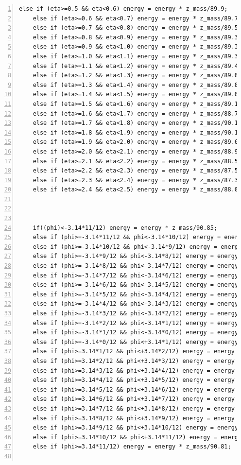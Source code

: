 \documentclass[11pt,a4paper,notitlepage]{scrartcl}
\begin{document}
\begin{lstlisting}[numbers=left, breaklines=true]
	else if (eta>=0.5 && eta<0.6) energy = energy * z_mass/89.9;
	else if (eta>=0.6 && eta<0.7) energy = energy * z_mass/89.72;
	else if (eta>=0.7 && eta<0.8) energy = energy * z_mass/89.59;
	else if (eta>=0.8 && eta<0.9) energy = energy * z_mass/89.33;
	else if (eta>=0.9 && eta<1.0) energy = energy * z_mass/89.39;
	else if (eta>=1.0 && eta<1.1) energy = energy * z_mass/89.30;
	else if (eta>=1.1 && eta<1.2) energy = energy * z_mass/89.49;
	else if (eta>=1.2 && eta<1.3) energy = energy * z_mass/89.04;
	else if (eta>=1.3 && eta<1.4) energy = energy * z_mass/89.81;
	else if (eta>=1.4 && eta<1.5) energy = energy * z_mass/89.06;
	else if (eta>=1.5 && eta<1.6) energy = energy * z_mass/89.1;
	else if (eta>=1.6 && eta<1.7) energy = energy * z_mass/88.7;
	else if (eta>=1.7 && eta<1.8) energy = energy * z_mass/90.12;
	else if (eta>=1.8 && eta<1.9) energy = energy * z_mass/90.1;
	else if (eta>=1.9 && eta<2.0) energy = energy * z_mass/89.6;
	else if (eta>=2.0 && eta<2.1) energy = energy * z_mass/88.96;
	else if (eta>=2.1 && eta<2.2) energy = energy * z_mass/88.5;
	else if (eta>=2.2 && eta<2.3) energy = energy * z_mass/87.5;
	else if (eta>=2.3 && eta<2.4) energy = energy * z_mass/87.36;
	else if (eta>=2.4 && eta<2.5) energy = energy * z_mass/88.0;
	
	
	
	if((phi)<-3.14*11/12) energy = energy * z_mass/90.85;
	else if (phi>=-3.14*11/12 && phi<-3.14*10/12) energy = energy * z_mass/91.4;
	else if (phi>=-3.14*10/12 && phi<-3.14*9/12) energy = energy * z_mass/91.22;
	else if (phi>=-3.14*9/12 && phi<-3.14*8/12) energy = energy * z_mass/91.1;
	else if (phi>=-3.14*8/12 && phi<-3.14*7/12) energy = energy * z_mass/91.08;
	else if (phi>=-3.14*7/12 && phi<-3.14*6/12) energy = energy * z_mass/91.08;
	else if (phi>=-3.14*6/12 && phi<-3.14*5/12) energy = energy * z_mass/91.29;
	else if (phi>=-3.14*5/12 && phi<-3.14*4/12) energy = energy * z_mass/91.33;
	else if (phi>=-3.14*4/12 && phi<-3.14*3/12) energy = energy * z_mass/90.91;
	else if (phi>=-3.14*3/12 && phi<-3.14*2/12) energy = energy * z_mass/91.19;
	else if (phi>=-3.14*2/12 && phi<-3.14*1/12) energy = energy * z_mass/91.4;
	else if (phi>=-3.14*1/12 && phi<-3.14*0/12) energy = energy * z_mass/90.92;
	else if (phi>=-3.14*0/12 && phi<+3.14*1/12) energy = energy * z_mass/90.84;
	else if (phi>=3.14*1/12 && phi<+3.14*2/12) energy = energy * z_mass/91.19;
	else if (phi>=3.14*2/12 && phi<+3.14*3/12) energy = energy * z_mass/91.4;
	else if (phi>=3.14*3/12 && phi<+3.14*4/12) energy = energy * z_mass/91.11;
	else if (phi>=3.14*4/12 && phi<+3.14*5/12) energy = energy * z_mass/91.32;
	else if (phi>=3.14*5/12 && phi<+3.14*6/12) energy = energy * z_mass/91.13;
	else if (phi>=3.14*6/12 && phi<+3.14*7/12) energy = energy * z_mass/91.17;
	else if (phi>=3.14*7/12 && phi<+3.14*8/12) energy = energy * z_mass/91.18;
	else if (phi>=3.14*8/12 && phi<+3.14*9/12) energy = energy * z_mass/91.09;
	else if (phi>=3.14*9/12 && phi<+3.14*10/12) energy = energy * z_mass/91.16;
	else if (phi>=3.14*10/12 && phi<+3.14*11/12) energy = energy * z_mass/91.43;
	else if (phi>=3.14*11/12) energy = energy * z_mass/90.81;
	

\end{lstlisting}
\end{document}
